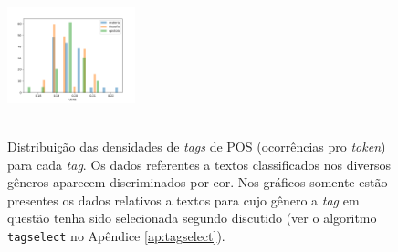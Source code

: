 \documentclass[10pt,a4paper,onecolumn]{article}
\theoremstyle{definition}
\theoremstyle{remark}
\begin{document}
\begin{figure}[htpb!]
\begin{multicols}{2}
	\hspace*{-1.75cm}
	\includegraphics[width=0.33\textwidth]{graficos/histograma_VERB.png} \\ \hspace*{-1.75cm}  \\
\end{multicols}
\caption{Distribuição das densidades de \emph{tags} de POS (ocorrências pro \emph{token}) para cada \emph{tag}. Os dados referentes a textos classificados nos diversos gêneros aparecem discriminados por cor. Nos gráficos somente estão presentes os dados relativos a textos para cujo gênero a \emph{tag} em questão tenha sido selecionada segundo discutido (ver o algoritmo \texttt{tagselect} no Apêndice \ref{ap:tagselect}).}
\label{fig:histogramas}
\end{figure}
\end{document}

